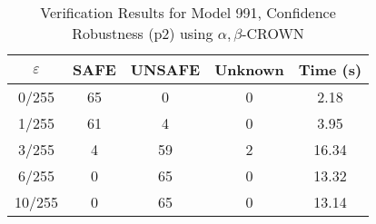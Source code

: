 \begin{table}[htbp]
\centering
\caption{Verification Results for Model 991, Confidence Robustness (p2) using $\alpha,\beta$-CROWN}
\label{tab:model991_p2_abcrown}
\begin{tabular}{|c|c|c|c|c|}
\hline
$\varepsilon$ & SAFE & UNSAFE & Unknown & Time (s) \\ \hline
0/255 & 65 & 0 & 0 & 2.18 \\ \hline
1/255 & 61 & 4 & 0 & 3.95 \\ \hline
3/255 & 4 & 59 & 2 & 16.34 \\ \hline
6/255 & 0 & 65 & 0 & 13.32 \\ \hline
10/255 & 0 & 65 & 0 & 13.14 \\ \hline
\end{tabular}
\end{table}

